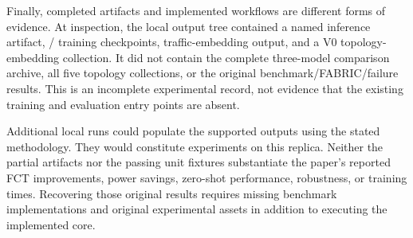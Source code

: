 \documentclass[11pt,a4paper]{article}
\newcommand{\code}[1]{\texttt{\detokenize{#1}}}
\begin{document}
Finally, completed artifacts and implemented workflows are different forms of
evidence. At inspection, the local output tree contained a named
\code{dc_t0} inference artifact, \code{dc_t0}/\code{dc_pcaps} training
checkpoints, traffic-embedding output, and a V0 topology-embedding collection.
It did not contain the complete three-model comparison archive, all five
topology collections, or the original benchmark/FABRIC/failure results.
This is an incomplete experimental record, not evidence that the existing
training and evaluation entry points are absent.

Additional local runs could populate the supported outputs using the stated
methodology. They would constitute experiments on this replica. Neither the
partial artifacts nor the passing unit fixtures substantiate the paper's
reported FCT improvements, power savings, zero-shot performance, robustness,
or training times. Recovering those original results requires missing
benchmark implementations and original experimental assets in addition to
executing the implemented core.
\end{document}
